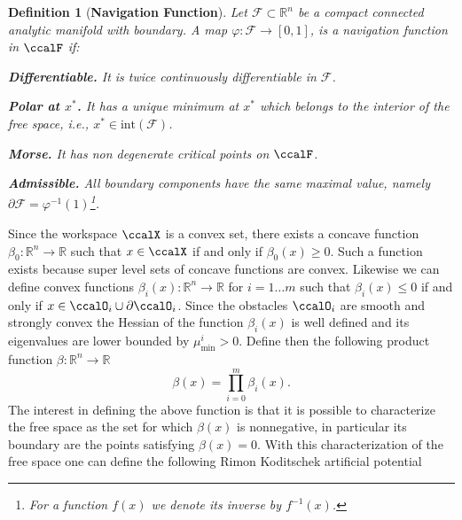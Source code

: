 \documentclass[article]{IEEEtran}
\newtheorem{definition}{Definition}
\theoremstyle{definition}
\begin{document}
%
\begin{definition}[\bf{Navigation Function}]\label{def_navigation_function} 
Let $\mathcal{F} \subset \mathbb{R}^n$ be a compact connected analytic manifold with boundary. A map $\varphi : \mathcal{F} \rightarrow [0,1]$, is a navigation function in $\ccalF$ if:
%
\begin{mylist}
\item[{\bf Differentiable.}] It is twice continuously differentiable in $\mathcal{F}$.
\item[{\bf Polar at $x^*$.}] It has a unique minimum at $x^*$ which belongs to the interior of the free space, i.e., $x^* \in \mbox{int}(\mathcal{F})$.
\item [{\bf Morse.}] It has non degenerate critical points on $\ccalF$.
\item [{\bf Admissible.}] All boundary components have the same maximal value, namely $\partial \mathcal{F} = \varphi^{-1}(1)$\footnote{For a function $f(x)$ we denote its inverse by $f^{-1}(x)$.}.
\end{mylist}
\end{definition}
%
%
Since the workspace $\ccalX$ is a convex set, there exists a concave function $\beta_0: \mathbb{R}^n \to \mathbb{R}$ such that $x\in \ccalX$ if and only if $\beta_0(x)\geq 0$. Such a function exists because super level sets of concave functions are convex. Likewise we can define convex functions $\beta_i(x): \mathbb{R}^n\to \mathbb{R}$ for $i=1\ldots m$ such that $\beta_i(x) \leq 0$ if and only if $x\in \ccalO_i \cup \partial \ccalO_i$. Since the obstacles $\ccalO_i$ are smooth and strongly convex the Hessian of the function $\beta_i(x)$ is well defined and its eigenvalues are lower bounded by $\mu^i_{\min}>0$. Define then the following product function $\beta:\mathbb{R}^n \to \mathbb{R}$  
%
\begin{equation}\label{eqn_beta}
\beta(x) = \prod_{i=0}^m \beta_i(x).
\end{equation}
%
The interest in defining the above function is that it is possible to characterize the free space as the set for which $\beta(x)$ is nonnegative, in particular its boundary are the points satisfying $\beta(x) =0$. With this characterization of the free space one can define the following Rimon Koditschek artificial potential 
\end{document}
